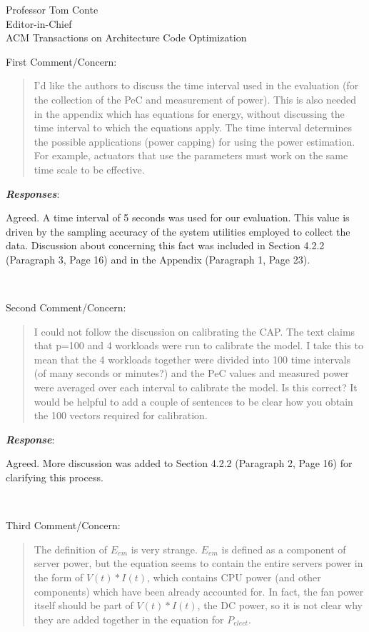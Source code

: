 \documentclass[10pt]{letter} %
\newenvironment{rviewcomment}
{~\\%
\begin{bfseries}}
{\end{bfseries}}
\newcommand{\rviewresponse}{\textbf{\textit{Response}}:}
\newcommand{\rviewresponses}{\textbf{\textit{Responses}}:}
\begin{document}
\begin{letter}{Professor Tom Conte \\
Editor-in-Chief \\
ACM Transactions on Architecture Code Optimization }
\begin{rviewcomment}
  First Comment/Concern:
\end{rviewcomment}
\begin{quote}
\begin{itshape}
I'd like the authors to discuss the time interval used in the evaluation
(for the collection of the PeC and measurement of power). This is also
needed in the appendix which has equations for energy, without
discussing the time interval to which the equations apply. The time
interval determines the possible applications (power capping) for using
the power estimation. For example, actuators that use the parameters
must work on the same time scale to be effective.
\end{itshape}
\end{quote}

\rviewresponses

Agreed. A time interval of 5 seconds was used for our evaluation. 
This value is driven by the sampling accuracy of the
system utilities employed to collect the data.
Discussion about concerning this fact was included in Section 4.2.2
(Paragraph 3, Page 16) and in the Appendix (Paragraph 1, Page 23).

\begin{rviewcomment}
  Second Comment/Concern:
\end{rviewcomment}
\begin{quote}
\begin{itshape}
I could not follow the discussion on calibrating the CAP. The text
claims that p=100 and 4 workloads were run to calibrate the model. I
take this to mean that the 4 workloads together were divided into 100
time intervals (of many seconds or minutes?) and the PeC values and
measured power were averaged over each interval to calibrate the
model. Is this correct? It would be helpful to add a couple of
sentences to be clear how you obtain the 100 vectors required for
calibration.
\end{itshape}
\end{quote}

\rviewresponse

Agreed.  More discussion was added to Section 4.2.2 (Paragraph 2, Page 16)
for clarifying this process.

\begin{rviewcomment}
  Third Comment/Concern:
\end{rviewcomment}
\begin{quote}
\begin{itshape}
The definition of $E_{em}$ is very strange. $E_{em}$ is defined as a component
of server power, but the equation seems to contain the entire servers
power in the form of $V(t) * I(t)$, which contains CPU power (and other
components) which have been already accounted for. In fact, the fan
power itself should be part of $V(t) * I(t)$, the DC power, so it is not
clear why they are added together in the equation for $P_{elect}$.
\end{itshape}
\end{quote}


\end{letter}
\end{document}
